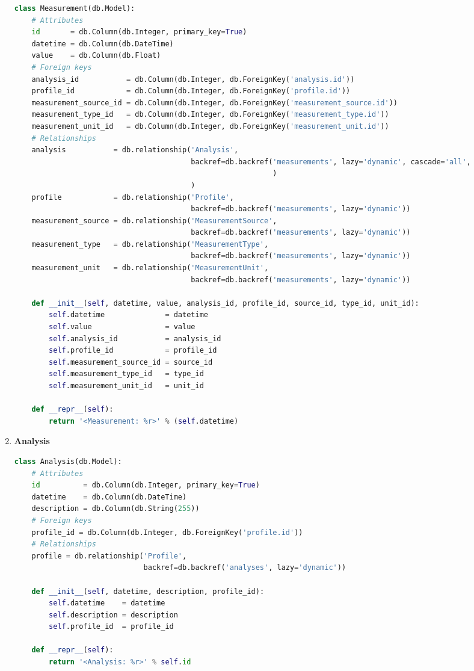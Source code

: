 \begin{enumerate}
\begin{lstlisting}[language=Python]
class Measurement(db.Model):
    # Attributes
    id       = db.Column(db.Integer, primary_key=True)
    datetime = db.Column(db.DateTime)
    value    = db.Column(db.Float)
    # Foreign keys
    analysis_id           = db.Column(db.Integer, db.ForeignKey('analysis.id'))
    profile_id            = db.Column(db.Integer, db.ForeignKey('profile.id'))
    measurement_source_id = db.Column(db.Integer, db.ForeignKey('measurement_source.id'))
    measurement_type_id   = db.Column(db.Integer, db.ForeignKey('measurement_type.id'))
    measurement_unit_id   = db.Column(db.Integer, db.ForeignKey('measurement_unit.id'))
    # Relationships
    analysis           = db.relationship('Analysis',
                                         backref=db.backref('measurements', lazy='dynamic', cascade='all',
                                                            )
                                         )
    profile            = db.relationship('Profile',
                                         backref=db.backref('measurements', lazy='dynamic'))
    measurement_source = db.relationship('MeasurementSource',
                                         backref=db.backref('measurements', lazy='dynamic'))
    measurement_type   = db.relationship('MeasurementType',
                                         backref=db.backref('measurements', lazy='dynamic'))
    measurement_unit   = db.relationship('MeasurementUnit',
                                         backref=db.backref('measurements', lazy='dynamic'))

    def __init__(self, datetime, value, analysis_id, profile_id, source_id, type_id, unit_id):
        self.datetime              = datetime
        self.value                 = value
        self.analysis_id           = analysis_id
        self.profile_id            = profile_id
        self.measurement_source_id = source_id
        self.measurement_type_id   = type_id
        self.measurement_unit_id   = unit_id

    def __repr__(self):
        return '<Measurement: %r>' % (self.datetime)
\end{lstlisting}
	
\item \textbf{Analysis}
\begin{lstlisting}[language=Python]
class Analysis(db.Model):
    # Attributes
    id          = db.Column(db.Integer, primary_key=True)
    datetime    = db.Column(db.DateTime)
    description = db.Column(db.String(255))
    # Foreign keys
    profile_id = db.Column(db.Integer, db.ForeignKey('profile.id'))
    # Relationships
    profile = db.relationship('Profile',
                              backref=db.backref('analyses', lazy='dynamic'))

    def __init__(self, datetime, description, profile_id):
        self.datetime    = datetime
        self.description = description
        self.profile_id  = profile_id

    def __repr__(self):
        return '<Analysis: %r>' % self.id
\end{lstlisting}
\end{enumerate}

